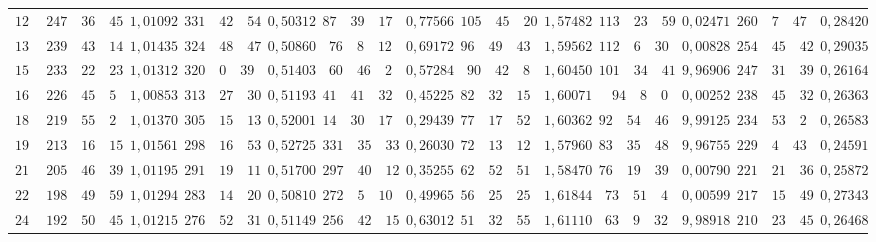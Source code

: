 \begin{landscape}
\begin{center}
\begin{tabular}{r|r|r|r|r|r|r|r|r|r|r|r|r}
\(120\) & \(247\quad 36\quad 45\) & \(1{,}01092\) & \(331\quad 42\quad 54\) & \(0{,}50312\) & \(87\quad 39\quad 17\) & \(0{,}77566\) & \(105\quad 45\quad 20\) & \(1{,}57482\) & \(113\quad 23\quad 59\) & \(0{,}02471\) & \(260\quad 7\quad 47\) & \(0{,}28420\) \\
\(135\) & \(239\quad 43\quad 14\) & \(1{,}01435\) & \(324\quad 48\quad 47\) & \(0{,}50860\) & \(76\quad 8\quad 12\) & \(0{,}69172\) & \(96\quad 49\quad 43\) & \(1{,}59562\) & \(112\quad 6\quad 30\) & \(0{,}00828\) & \(254\quad 45\quad 42\) & \(0{,}29035\) \\
\(150\) & \(233\quad 22\quad 23\) & \(1{,}01312\) & \(320\quad 0\quad 39\) & \(0{,}51403\) & \(60\quad 46\quad 2\) & \(0{,}57284\) & \(90\quad 42\quad 8\) & \(1{,}60450\) & \(101\quad 34\quad 41\) & \(9{,}96906\) & \(247\quad 31\quad 39\) & \(0{,}26164\) \\
\(165\) & \(226\quad 45\quad 5\) & \(1{,}00853\) & \(313\quad 27\quad 30\) & \(0{,}51193\) & \(41\quad 41\quad 32\) & \(0{,}45225\) & \(82\quad 32\quad 15\) & \(1{,}60071\) & \(94\quad 8\quad 0\) & \(0{,}00252\) & \(238\quad 45\quad 32\) & \(0{,}26363\) \\[3pt]
\(180\) & \(219\quad 55\quad 2\) & \(1{,}01370\) & \(305\quad 15\quad 13\) & \(0{,}52001\) & \(14\quad 30\quad 17\) & \(0{,}29439\) & \(77\quad 17\quad 52\) & \(1{,}60362\) & \(92\quad 54\quad 46\) & \(9{,}99125\) & \(234\quad 53\quad 2\) & \(0{,}26583\) \\
\(195\) & \(213\quad 16\quad 15\) & \(1{,}01561\) & \(298\quad 16\quad 53\) & \(0{,}52725\) & \(331\quad 35\quad 33\) & \(0{,}26030\) & \(72\quad 13\quad 12\) & \(1{,}57960\) & \(83\quad 35\quad 48\) & \(9{,}96755\) & \(229\quad 4\quad 43\) & \(0{,}24591\) \\
\(210\) & \(205\quad 46\quad 39\) & \(1{,}01195\) & \(291\quad 19\quad 11\) & \(0{,}51700\) & \(297\quad 40\quad 12\) & \(0{,}35255\) & \(62\quad 52\quad 51\) & \(1{,}58470\) & \(76\quad 19\quad 39\) & \(0{,}00790\) & \(221\quad 21\quad 36\) & \(0{,}25872\) \\
\(225\) & \(198\quad 49\quad 59\) & \(1{,}01294\) & \(283\quad 14\quad 20\) & \(0{,}50810\) & \(272\quad 5\quad 10\) & \(0{,}49965\) & \(56\quad 25\quad 25\) & \(1{,}61844\) & \(73\quad 51\quad 4\) & \(0{,}00599\) & \(217\quad 15\quad 49\) & \(0{,}27343\) \\[3pt]
\(240\) & \(192\quad 50\quad 45\) & \(1{,}01215\) & \(276\quad 52\quad 31\) & \(0{,}51149\) & \(256\quad 42\quad 15\) & \(0{,}63012\) & \(51\quad 32\quad 55\) & \(1{,}61110\) & \(63\quad 9\quad 32\) & \(9{,}98918\) & \(210\quad 23\quad 45\) & \(0{,}26468\) \\

\end{tabular}
\end{center}
\end{landscape}
